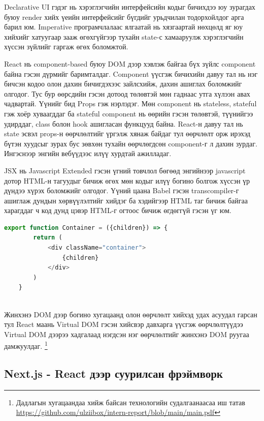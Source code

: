 Declarative UI гэдэг нь хэрэглэгчийн интерфейсийн кодыг бичихдээ юу зурагдах буюу render хийх үеийн интерфейсийг бүгдийг урьдчилан тодорхойлдог арга барил юм. Imperative програмчлалаас ялгаатай нь хязгаартай нөхцөлд яг юу хийхийг хатуугаар зааж өгөхгүйгээр тухайн state-с хамааруулж хэрэглэгчийн хүссэн зүйлийг гаргаж өгөх боломжтой.   

React нь component-based буюу DOM дээр хэвлэж байгаа бүх зүйлс component байна гэсэн дүрмийг баримталдаг. Component үүсгэж бичихийн давуу тал нь нэг бичсэн кодоо олон дахин бичигдэхээс зайлсхийж, дахин ашиглах боломжийг олгодог. Тус бур өөрсдийн гэсэн дотоод төлөвтэй мөн гаднаас утга хүлээн авах чадвартай. Үүнийг бид Props гэж нэрлэдэг. Мөн component нь stateless, stateful гэж хоёр хуваагддаг ба stateful component нь өөрийн гэсэн төлөвтэй, түүнийгээ удирддаг, class болон hook ашигласан функцууд байна. React-н давуу тал нь state эсвэл props-н өөрчлөлтийг үргэлж хянаж байдаг тул өөрчлөлт орж ирэхэд бүтэн хуудсыг зурах бус зөвхөн тухайн өөрчлөгдсөн component-г л дахин зурдаг. Ингэснээр энгийн вебүүдээс илүү хурдтай ажилладаг.

JSX нь Javascript Extended гэсэн үгний товчлол бөгөөд энгийнээр javascript дотор HTML-н тагуудыг бичиж өгөх мөн кодыг илүү богино болгож хүссэн үр дүндээ хүрэх боломжийг олгодог. Үүний цаана Babel гэсэн transcompiler-г ашиглаж дундын хөрвүүлэлтийг хийдэг ба хэдийгээр HTML таг бичиж байгаа харагддаг ч код дунд цэвэр HTML-г огтоос бичиж өгдөггүй гэсэн үг юм. 

\begin{lstlisting}[language=Javascript, caption=JSX ашиглаж 'container' класстай html элемент буцаах компонент, frame=single]
	export function Container = ({children}) => {
		return (
			<div className="container">
				{children}
			</div>
		)
	}
			
\end{lstlisting}

Жинхэнэ DOM дээр богино хугацаанд олон өөрчлөлт хийхэд удах асуудал гарсан тул React маань Virtual DOM гэсэн хийсвэр давхарга үүсгэж өөрчлөлтүүдээ Virtual DOM дээрээ хадгалаад нэгдсэн нэг өөрчлөлтийг жинхэнэ DOM руугаа дамжуулдаг. \footnote{Дадлагын хугацаандаа хийж байсан технологийн судалгаанаасаа иш татав \url{https://github.com/ulziibox/intern-report/blob/main/main.pdf}}

\subsection{Next.js - React дээр суурилсан фрэймворк}

